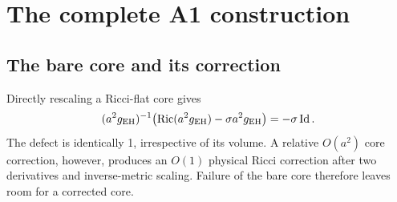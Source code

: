 \documentclass[a4paper,11pt]{article}
\numberwithin{equation}{section}
\theoremstyle{definition}
\newcommand{\Ric}{\operatorname{Ric}}
\newcommand{\Id}{\operatorname{Id}}
\begin{document}
\section{The complete A1 construction}\label{sec:A1-proof}
\subsection{The bare core and its correction}
Directly rescaling a Ricci-flat core gives
\[
(a^2g_{\rm EH})^{-1}\bigl(\Ric(a^2g_{\rm EH})-\sigma a^2g_{\rm EH}\bigr)=-\sigma\Id.
\]
The defect is identically 1, irrespective of its volume. A relative $O(a^2)$ core correction, however, produces an $O(1)$ physical Ricci correction after two derivatives and inverse-metric scaling. Failure of the bare core therefore leaves room for a corrected core.
\end{document}

